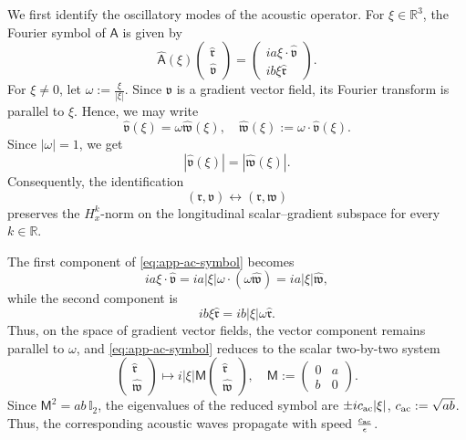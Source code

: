 \documentclass[10pt,reqno]{amsart}
\numberwithin{equation}{section}
\newcommand{\lt}{\left}
\newcommand{\rt}{\right}
\newcommand{\R}{\mathbb R}
\newcommand{\bq}{\begin{equation}}
\newcommand{\eq}{\end{equation}}
\begin{document}
We first identify the oscillatory modes of the acoustic operator. For $\xi\in\R^3$, the Fourier symbol of $\mathsf A$ is given by
\bq \label{eq:app-ac-symbol}
\widehat{\mathsf A}(\xi)
\begin{pmatrix}
\widehat{\mathfrak r}\\
\widehat{\mathfrak v}
\end{pmatrix}
=
\begin{pmatrix}
ia\xi\cdot\widehat{\mathfrak v}\\
ib\xi\widehat{\mathfrak r}
\end{pmatrix}.
\eq
For $\xi\neq0$, let $\omega := \frac{\xi}{|\xi|}$. Since $\mathfrak v$ is a gradient vector field, its Fourier transform is parallel to $\xi$. Hence, we may write
\[
\widehat{\mathfrak v}(\xi) = \omega \widehat{\mathfrak w}(\xi), \quad
\widehat{\mathfrak w}(\xi) := \omega \cdot \widehat{\mathfrak v}(\xi).
\]
Since $|\omega|=1$, we get
\[
|\widehat{\mathfrak v}(\xi)|=|\widehat{\mathfrak w}(\xi)|.
\]
Consequently, the identification
\[
(\mathfrak r,\mathfrak v)\longleftrightarrow(\mathfrak r,\mathfrak w)
\]
preserves the $H^k_x$-norm on the longitudinal scalar--gradient subspace for every $k\in\R$.

The first component of \eqref{eq:app-ac-symbol} becomes
\[
ia\xi\cdot\widehat{\mathfrak v} = ia|\xi|\omega\cdot\lt(\omega\widehat{\mathfrak w}\rt) = ia|\xi|\widehat{\mathfrak w},
\]
while the second component is
\[
ib\xi\widehat{\mathfrak r} = ib|\xi|\omega\widehat{\mathfrak r}.
\]
Thus, on the space of gradient vector fields, the vector component remains parallel to $\omega$, and \eqref{eq:app-ac-symbol} reduces to the scalar two-by-two system
\[
\begin{pmatrix}
\widehat{\mathfrak r}\\
\widehat{\mathfrak w}
\end{pmatrix}
\longmapsto i|\xi| \mathsf M
\begin{pmatrix}
\widehat{\mathfrak r}\\
\widehat{\mathfrak w}
\end{pmatrix},
\quad
\mathsf M :=
\begin{pmatrix}
0 & a\\
b & 0
\end{pmatrix}.
\]
Since $\mathsf M^2 = ab\, \mathbb I_2$, the eigenvalues of the reduced symbol are $\pm ic_{\rm ac} |\xi|$, $c_{\rm ac} := \sqrt{ab}$.  Thus, the corresponding acoustic waves propagate with speed $\frac{c_{\rm ac}}\epsilon$.
 
\end{document}
